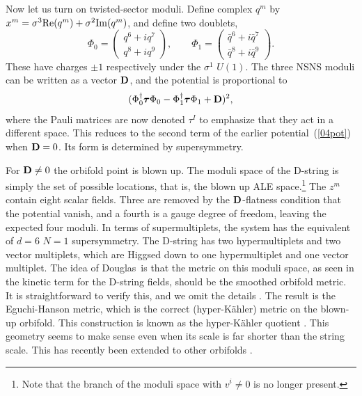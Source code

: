 \documentclass[12pt]{article}
\def\D{{\bf D}}
\begin{document}
Now let us turn on twisted-sector moduli.  Define complex $q^m$ 
by $x^m = \sigma^3 {\rm Re}(q^m) + \sigma^2 {\rm Im}(q^m)$, and define two
doublets,
\begin{equation}
\Phi_0 = \left( \begin{array}{c} q^6 + i q^7 \\ q^8 + i q^9
\end{array} \right), \qquad
\Phi_1 = \left( \begin{array}{c} \bar q^6 + i \bar q^7 \\ \bar q^8 + i
\bar q^9
\end{array} \right).
\end{equation}
These have charges $\pm 1$ respectively under the $\sigma^1$ $U(1)$.
The three NSNS moduli can be written as a vector $\D$,
and the potential is proportional to
\begin{equation}
(\Phi_0^\dagger \mbox{\boldmath$\tau$} \Phi_0 - \Phi_1^\dagger
\mbox{\boldmath$\tau$} \Phi_1 + \D)^2,
\end{equation}
where the Pauli matrices are now denoted $\tau^I$ to emphasize that they
act in a different space.  This reduces to the second term of the
earlier potential~(\ref{04pot}) when $\D = 0$.  Its form
is determined by supersymmetry.

For $\D \neq 0$ the
orbifold point is blown up.  The moduli space
of the D-string is simply the set of possible locations, that is, the
blown up ALE space.\footnote
{Note that the branch of the
moduli space with $v^i \neq 0$ is no longer present.}  The $z^m$ contain
eight scalar fields.  Three are removed by the $\D$-flatness condition
that the potential vanish, and a fourth is a gauge degree of freedom,
leaving the expected four moduli.  In terms of supermultiplets, the
system has the equivalent of $d=6$ $N=1$ supersymmetry.  The D-string
has two hypermultiplets and two vector multiplets, which
are Higgsed down to one
hypermultiplet and one vector multiplet. 
The idea of
Douglas\, \cite{dougprobe} is that the metric on this moduli space, as seen in
the kinetic term for the D-string fields, should be the smoothed orbifold
metric.  It is straightforward to verify this, and we omit the
details \cite{tensors}.  The result is the Eguchi-Hanson metric, \cite{ale} which
is the correct (hyper-K\"ahler) metric on the blown-up orbifold.  This
construction is known as the hyper-K\"ahler quotient \cite{hyper}.  This
geometry seems to make sense even when its scale is far shorter than the
string scale.  This has recently been extended to other
orbifolds \cite{cvjmyers}.
\end{document}
